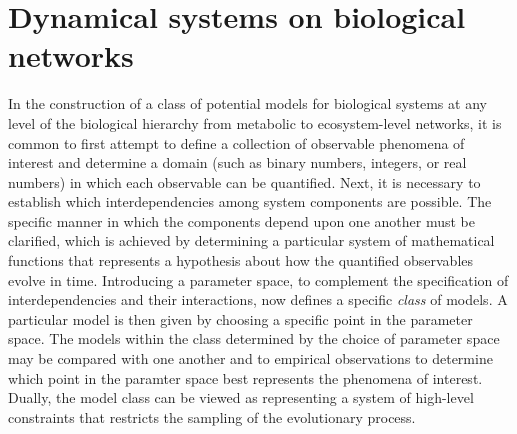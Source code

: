 
\section{Dynamical systems on biological networks}\label{suppsec:dynsysbionet}
In the construction of a class of potential models for biological systems at any level of the biological hierarchy from metabolic to ecosystem-level networks, it is common to first attempt to define a collection of observable phenomena of interest and determine a domain (such as binary numbers, integers, or real numbers) in which each observable can be quantified. Next, it is necessary to establish which interdependencies among system components are possible. The specific manner in which the components depend upon one another must be clarified, which is achieved by determining a particular system of mathematical functions that represents a hypothesis about how the quantified observables evolve in time.
Introducing a parameter space, to complement the specification of interdependencies and their interactions, now defines a specific \emph{class} of models. A particular model is then given by choosing a specific point in the parameter space. The models within the class determined by the choice of parameter space may be compared with one another and to empirical observations to determine which point in the paramter space best represents the phenomena of interest. Dually, the model class can be viewed as representing a system of high-level constraints that restricts the sampling of the evolutionary process.

